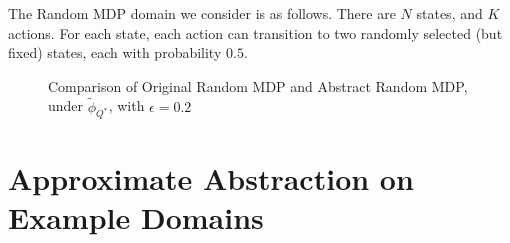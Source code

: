 \documentclass{article}
\newcommand{\ep}{\widetilde \phi}
\newcommand{\epQ}{\ep_{Q^*}}
\begin{document}
The Random MDP domain we consider is as follows. There are $N$ states, and $K$ actions. For each state, each action can transition to two randomly selected (but fixed) states, each with probability $0.5$. 

\begin{figure}
\label{fig:minefield-visual}
\caption{Comparison of Original Random MDP and Abstract Random MDP, under $\epQ$, with $\epsilon=0.2$}
\end{figure} 






\section{Approximate Abstraction on Example Domains}
\end{document}
